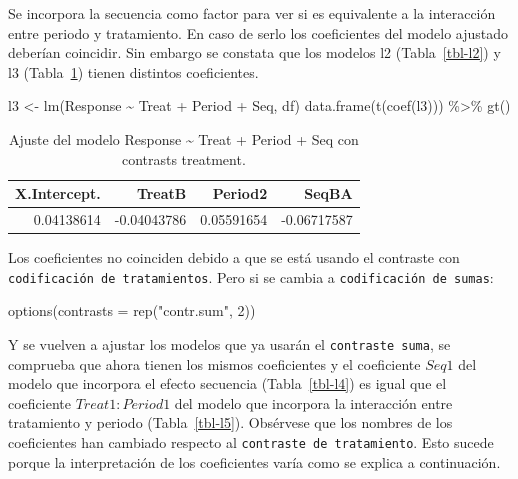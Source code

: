 \documentclass[
  12pt,
  a4paper,
  extrafontsizes,
  onecolumn,
  openright,
  table]{memoir}
\newenvironment{Shaded}{\begin{snugshade}}{\end{snugshade}}
\newcommand{\AttributeTok}[1]{\textcolor[rgb]{0.40,0.45,0.13}{#1}}
\newcommand{\DecValTok}[1]{\textcolor[rgb]{0.68,0.00,0.00}{#1}}
\newcommand{\FunctionTok}[1]{\textcolor[rgb]{0.28,0.35,0.67}{#1}}
\newcommand{\NormalTok}[1]{\textcolor[rgb]{0.00,0.23,0.31}{#1}}
\newcommand{\OtherTok}[1]{\textcolor[rgb]{0.00,0.23,0.31}{#1}}
\newcommand{\SpecialCharTok}[1]{\textcolor[rgb]{0.37,0.37,0.37}{#1}}
\newcommand{\StringTok}[1]{\textcolor[rgb]{0.13,0.47,0.30}{#1}}
\begin{document}
Se incorpora la secuencia como factor para ver si es equivalente a la
interacción entre periodo y tratamiento. En caso de serlo los
coeficientes del modelo ajustado deberían coincidir. Sin embargo se
constata que los modelos l2 (Tabla~\ref{tbl-l2}) y l3
(Tabla~\ref{tbl-l3}) tienen distintos coeficientes.

\scriptsize

\begin{Shaded}
\begin{Highlighting}[]
\NormalTok{l3 }\OtherTok{\textless{}{-}} \FunctionTok{lm}\NormalTok{(Response }\SpecialCharTok{\textasciitilde{}}\NormalTok{ Treat }\SpecialCharTok{+}\NormalTok{ Period }\SpecialCharTok{+}\NormalTok{ Seq, df)}
\FunctionTok{data.frame}\NormalTok{(}\FunctionTok{t}\NormalTok{(}\FunctionTok{coef}\NormalTok{(l3))) }\SpecialCharTok{\%\textgreater{}\%} \FunctionTok{gt}\NormalTok{()}
\end{Highlighting}
\end{Shaded}

\hypertarget{tbl-l3}{}
\begin{longtable}{rrrr}
\caption{\label{tbl-l3}Ajuste del modelo Response \textasciitilde{} Treat + Period + Seq con
contrasts treatment. }\tabularnewline

\toprule
X.Intercept. & TreatB & Period2 & SeqBA \\ 
\midrule
0.04138614 & -0.04043786 & 0.05591654 & -0.06717587 \\ 
\bottomrule
\end{longtable}

\normalsize

Los coeficientes no coinciden debido a que se está usando el contraste
con \texttt{codificación\ de\ tratamientos}. Pero si se cambia a
\texttt{codificación\ de\ sumas}:

\scriptsize

\begin{Shaded}
\begin{Highlighting}[]
\FunctionTok{options}\NormalTok{(}\AttributeTok{contrasts =} \FunctionTok{rep}\NormalTok{(}\StringTok{"contr.sum"}\NormalTok{, }\DecValTok{2}\NormalTok{))}
\end{Highlighting}
\end{Shaded}

\normalsize

Y se vuelven a ajustar los modelos que ya usarán el
\texttt{contraste\ suma}, se comprueba que ahora tienen los mismos
coeficientes y el coeficiente \(Seq1\) del modelo que incorpora el
efecto secuencia (Tabla~\ref{tbl-l4}) es igual que el coeficiente
\(Treat1:Period1\) del modelo que incorpora la interacción entre
tratamiento y periodo (Tabla~\ref{tbl-l5}). Obsérvese que los nombres de
los coeficientes han cambiado respecto al
\texttt{contraste\ de\ tratamiento}. Esto sucede porque la
interpretación de los coeficientes varía como se explica a continuación.
\end{document}
